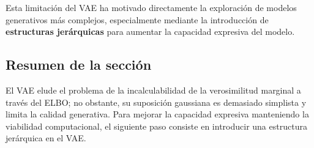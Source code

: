 Esta limitación del VAE ha motivado directamente la exploración de modelos generativos más complejos, especialmente mediante la introducción de \textbf{estructuras jerárquicas} para aumentar la capacidad expresiva del modelo.

\subsection{Resumen de la sección}

El VAE elude el problema de la incalculabilidad de la verosimilitud marginal a través del ELBO; no obstante, su suposición gaussiana es demasiado simplista y limita la calidad generativa. Para mejorar la capacidad expresiva manteniendo la viabilidad computacional, el siguiente paso consiste en introducir una estructura jerárquica en el VAE.

